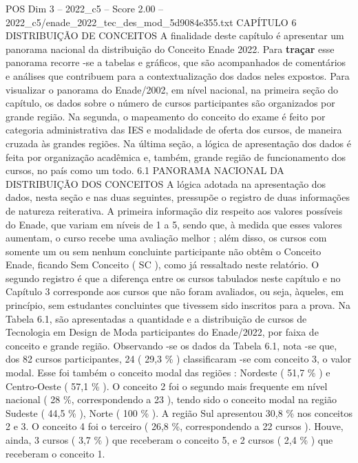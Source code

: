 \begin{textsample}{POS Dim 3 – 2022\_c5 – Score 2.00 – 2022\_c5/enade\_2022\_tec\_des\_mod\_5d9084e355.txt}  \label{ex:f3_pos_065}
CAPÍTULO 6 DISTRIBUIÇÃO DE CONCEITOS A finalidade deste capítulo é apresentar um panorama nacional da distribuição do Conceito Enade 2022.
Para \textbf{traçar} esse panorama recorre -se a tabelas e gráficos, que são acompanhados de comentários e análises que contribuem para a contextualização dos dados neles expostos.
Para visualizar o panorama do Enade/2002, em nível nacional, na primeira seção do capítulo, os dados sobre o número de cursos participantes são organizados por grande região.
Na segunda, o mapeamento do conceito do exame é feito por categoria administrativa das IES e modalidade de oferta dos cursos, de maneira cruzada às grandes regiões.
Na última seção, a lógica de apresentação dos dados é feita por organização acadêmica e, também, grande região de funcionamento dos cursos, no país como um todo. 6.1 PANORAMA NACIONAL DA DISTRIBUIÇÃO DOS CONCEITOS A lógica adotada na apresentação dos dados, nesta seção e nas duas seguintes, pressupõe o registro de duas informações de natureza reiterativa.
A primeira informação diz respeito aos valores possíveis do Enade, que variam em níveis de 1 a 5, sendo que, à medida que esses valores aumentam, o curso recebe uma avaliação melhor ; além disso, os cursos com somente um ou sem nenhum concluinte participante não obtêm o Conceito Enade, ficando Sem Conceito ( SC ), como já ressaltado neste relatório.
O segundo registro é que a diferença entre os cursos tabulados neste capítulo e no Capítulo 3 corresponde aos cursos que não foram avaliados, ou seja, àqueles, em princípio, sem estudantes concluintes que tivessem sido inscritos para a prova.
Na Tabela 6.1, são apresentadas a quantidade e a distribuição de cursos de Tecnologia em Design de Moda participantes do Enade/2022, por faixa de conceito e grande região.
Observando -se os dados da Tabela 6.1, nota -se que, dos 82 cursos participantes, 24 ( 29,3 \% ) classificaram -se com conceito 3, o valor modal.
Esse foi também o conceito modal das regiões : Nordeste ( 51,7 \% ) e Centro-Oeste ( 57,1 \% ).
O conceito 2 foi o segundo mais frequente em nível nacional ( 28 \%, correspondendo a 23 ), tendo sido o conceito modal na região Sudeste ( 44,5 \% ), Norte ( 100 \% ).
A região Sul apresentou 30,8 \% nos conceitos 2 e 3.
O conceito 4 foi o terceiro ( 26,8 \%, correspondendo a 22 cursos ).
Houve, ainda, 3 cursos ( 3,7 \% ) que receberam o conceito 5, e 2 cursos ( 2,4 \% ) que receberam o conceito 1.

\end{textsample}

